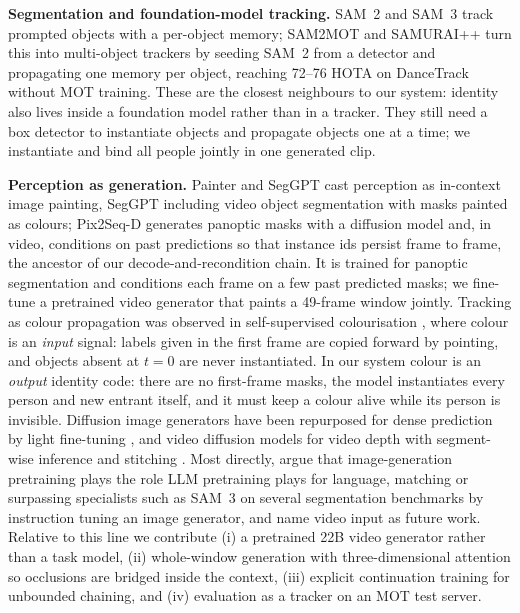 \documentclass{article} %
\newcommand{\rev}[1]{{\color{blue}#1}}
\begin{document}
\textbf{Segmentation and foundation-model tracking.} SAM~2 \citep{ravi2025sam2} and SAM~3
\citep{carion2026sam3} track prompted objects with a per-object memory; SAM2MOT
\citep{jiang2026sam2mot} and SAMURAI++ \citep{yang2026samuraipp} turn this into
multi-object trackers by seeding SAM~2 from a detector and propagating one memory per
object, reaching 72--76 HOTA on DanceTrack without MOT training. These are the closest
neighbours to our system: identity also lives inside a foundation model rather than in a
tracker. They still need a box detector to instantiate objects and propagate objects one at
a time; we instantiate and bind all people jointly in one generated clip.

\textbf{Perception as generation.} Painter \citep{wang2023painter} and SegGPT
\citep{wang2023seggpt} cast perception as in-context image painting, SegGPT including
video object segmentation with masks painted as colours; Pix2Seq-D \citep{chen2023pix2seqd}
generates panoptic masks with a diffusion model and, in video, conditions on past
predictions so that instance ids persist frame to frame, the ancestor of our
decode-and-recondition chain\rev{. It is trained for panoptic segmentation and conditions
each frame on a few past predicted masks; we fine-tune a pretrained video generator
that paints a 49-frame window jointly}.
Tracking as colour propagation was observed in
self-supervised colourisation \citep{vondrick2018colorize}\rev{, where colour is an
\emph{input} signal: labels given in the first frame are copied forward by pointing, and
objects absent at $t{=}0$ are never instantiated. In our system colour is an \emph{output}
identity code: there are no first-frame masks, the model instantiates every person and
new entrant itself, and it must keep a colour alive while its person is invisible}.
Diffusion image generators have
been repurposed for dense prediction by light fine-tuning \citep{ke2024marigold}, and video
diffusion models for video depth with segment-wise inference and stitching
\citep{hu2025depthcrafter,chen2025videodepthanything}. Most directly,
\citet{gabeur2026imagegen} argue that image-generation pretraining plays the role LLM
pretraining plays for language, matching or surpassing specialists such as SAM~3 on several
segmentation benchmarks by instruction tuning an image generator, and name video input as
future work. Relative to this line we contribute (i) a pretrained 22B video generator
rather than a task model, (ii) whole-window generation with three-dimensional attention so
occlusions are bridged inside the context, (iii) explicit continuation training for
unbounded chaining, and (iv) evaluation as a tracker on an MOT test server.
\end{document}
